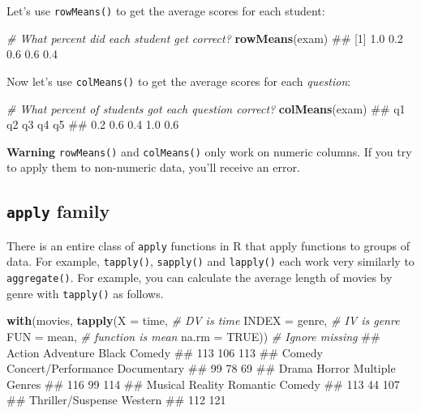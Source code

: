 \documentclass[]{book}
\newenvironment{Shaded}{\begin{snugshade}}{\end{snugshade}}
\newcommand{\KeywordTok}[1]{\textcolor[rgb]{0.13,0.29,0.53}{\textbf{#1}}}
\newcommand{\DataTypeTok}[1]{\textcolor[rgb]{0.13,0.29,0.53}{#1}}
\newcommand{\CommentTok}[1]{\textcolor[rgb]{0.56,0.35,0.01}{\textit{#1}}}
\newcommand{\OtherTok}[1]{\textcolor[rgb]{0.56,0.35,0.01}{#1}}
\newcommand{\NormalTok}[1]{#1}
\theoremstyle{definition}
\theoremstyle{definition}
\theoremstyle{remark}
\begin{document}
Let's use \texttt{rowMeans()} to get the average scores for each
student:

\begin{Shaded}
\begin{Highlighting}[]
\CommentTok{# What percent did each student get correct?}
\KeywordTok{rowMeans}\NormalTok{(exam)}
\NormalTok{## [1] 1.0 0.2 0.6 0.6 0.4}
\end{Highlighting}
\end{Shaded}

Now let's use \texttt{colMeans()} to get the average scores for each
\emph{question}:

\begin{Shaded}
\begin{Highlighting}[]
\CommentTok{# What percent of students got each question correct?}
\KeywordTok{colMeans}\NormalTok{(exam)}
\NormalTok{##  q1  q2  q3  q4  q5 }
\NormalTok{## 0.2 0.6 0.4 1.0 0.6}
\end{Highlighting}
\end{Shaded}

\textbf{Warning} \texttt{rowMeans()} and \texttt{colMeans()} only work
on numeric columns. If you try to apply them to non-numeric data, you'll
receive an error.

\subsection{\texorpdfstring{\texttt{apply}
family}{apply family}}\label{apply-family}

There is an entire class of \texttt{apply} functions in R that apply
functions to groups of data. For example, \texttt{tapply()},
\texttt{sapply()} and \texttt{lapply()} each work very similarly to
\texttt{aggregate()}. For example, you can calculate the average length
of movies by genre with \texttt{tapply()} as follows.

\begin{Shaded}
\begin{Highlighting}[]
\KeywordTok{with}\NormalTok{(movies, }\KeywordTok{tapply}\NormalTok{(}\DataTypeTok{X =}\NormalTok{ time,        }\CommentTok{# DV is time}
                    \DataTypeTok{INDEX =}\NormalTok{ genre,   }\CommentTok{# IV is genre}
                    \DataTypeTok{FUN =}\NormalTok{ mean,      }\CommentTok{# function is mean}
                    \DataTypeTok{na.rm =} \OtherTok{TRUE}\NormalTok{))   }\CommentTok{# Ignore missing}
\NormalTok{##              Action           Adventure        Black Comedy }
\NormalTok{##                 113                 106                 113 }
\NormalTok{##              Comedy Concert/Performance         Documentary }
\NormalTok{##                  99                  78                  69 }
\NormalTok{##               Drama              Horror     Multiple Genres }
\NormalTok{##                 116                  99                 114 }
\NormalTok{##             Musical             Reality     Romantic Comedy }
\NormalTok{##                 113                  44                 107 }
\NormalTok{##   Thriller/Suspense             Western }
\NormalTok{##                 112                 121}
\end{Highlighting}
\end{Shaded}
\end{document}
